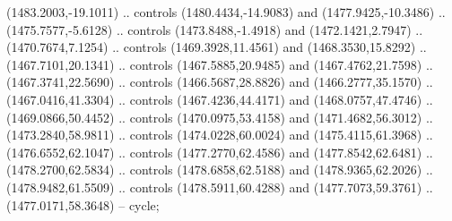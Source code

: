 \begin{scope}[shift={(-22.88722,-49.76189)}]
\begin{scope}[shift={(-739.46591,328.36782)}]
      (1483.2003,-19.1011) .. controls (1480.4434,-14.9083) and (1477.9425,-10.3486)
      .. (1475.7577,-5.6128) .. controls (1473.8488,-1.4918) and (1472.1421,2.7947)
      .. (1470.7674,7.1254) .. controls (1469.3928,11.4561) and (1468.3530,15.8292)
      .. (1467.7101,20.1341) .. controls (1467.5885,20.9485) and (1467.4762,21.7598)
      .. (1467.3741,22.5690) .. controls (1466.5687,28.8826) and (1466.2777,35.1570)
      .. (1467.0416,41.3304) .. controls (1467.4236,44.4171) and (1468.0757,47.4746)
      .. (1469.0866,50.4452) .. controls (1470.0975,53.4158) and (1471.4682,56.3012)
      .. (1473.2840,58.9811) .. controls (1474.0228,60.0024) and (1475.4115,61.3968)
      .. (1476.6552,62.1047) .. controls (1477.2770,62.4586) and (1477.8542,62.6481)
      .. (1478.2700,62.5834) .. controls (1478.6858,62.5188) and (1478.9365,62.2026)
      .. (1478.9482,61.5509) .. controls (1478.5911,60.4288) and (1477.7073,59.3761)
      .. (1477.0171,58.3648) -- cycle;


\end{scope}
\end{scope}
